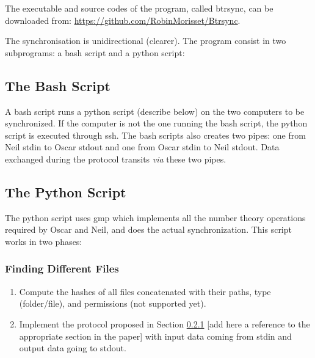 \documentclass[11pt]{llncs}
\begin{document}
The executable and source codes of the program, called {\sf btrsync}, can be downloaded from: \url{https://github.com/RobinMorisset/Btrsync}.\smallskip

The synchronisation is unidirectional (clearer). The program consist in two subprograms: a bash script and a python script:

\subsection{The Bash Script}

A bash script runs a python script (describe below) on the two computers to be synchronized. If the computer is not the one running the bash script, the python script is executed through ssh. The bash scripts also creates two pipes: one from Neil stdin to Oscar stdout and one from Oscar stdin to Neil stdout. Data exchanged during the protocol transits {\sl via} these two pipes.

\subsection{The Python Script}

The python script uses gmp which implements all the number theory operations required by Oscar and Neil, and does the actual synchronization. This script works in two phases:

\subsubsection{Finding Different Files}

\begin{enumerate}
\item Compute the hashes of all files concatenated with their paths, type (folder/file), and permissions (not supported yet).
\item Implement the protocol proposed in Section \ref{} [add here a reference to the appropriate section in the paper] with input data coming from stdin and output data going to stdout.
\end{enumerate}
\end{document}
